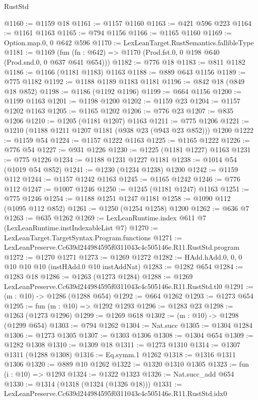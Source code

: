 \begin{lexlean}{RustStd}
\begin{coremodule}
@1160 := @1159 @18
@1161 := @1157 @1160
@1163 := @421 @596 @223
@1164 := @1161 @1163
@1165 := @794 @1156
@1166 := @1165 @1160
@1169 := Option.map.{0, 0} @642 @596
@1170 := LexLeanTarget.RustSemantics.fallibleType
@1181 := @1169
    (fun (fn : @642) => @1170 (Prod.fst.{0, 0} @198 @640 (Prod.snd.{0, 0} @637 @641 @654)))
@1182 := @776 @18
@1183 := @811 @1182
@1186 := @1166 (@1181 @1183) @1163
@1188 := @889 @643 @1156
@1189 := @775 @1182
@1192 := @1188 @1189 @1183 @1181
@1196 := @842 @18 (@849 @18 @852)
@1198 := @1186 (@1192 @1196)
@1199 := @664 @1156
@1200 := @1199 @1163
@1201 := @1198 @1200
@1202 := @1159 @23
@1204 := @1157 @1202 @1163
@1205 := @1165 @1202
@1206 := @776 @23
@1207 := @835 @1206
@1210 := @1205 (@1181 @1207) @1163
@1211 := @775 @1206
@1221 := @1210 (@1188 @1211 @1207 @1181 (@938 @23 (@943 @23 @852))) @1200
@1222 := @1159 @54
@1224 := @1157 @1222 @1163
@1225 := @1165 @1222
@1226 := @776 @54
@1227 := @931 @1226
@1230 := @1225 (@1181 @1227) @1163
@1231 := @775 @1226
@1234 := @1188 @1231 @1227 @1181
@1238 := @1014 @54 (@1019 @54 @852)
@1241 := @1230 (@1234 @1238) @1200
@1242 := @1159 @112
@1244 := @1157 @1242 @1163
@1245 := @1165 @1242
@1246 := @776 @112
@1247 := @1007 @1246
@1250 := @1245 (@1181 @1247) @1163
@1251 := @775 @1246
@1254 := @1188 @1251 @1247 @1181
@1258 := @1090 @112 (@1095 @112 @852)
@1261 := @1250 (@1254 @1258) @1200
@1262 := @636 @7
@1263 := @635 @1262
@1269 := LexLeanRuntime.index @611 @7 (LexLeanRuntime.instIndexableList @7)
@1270 := LexLeanTarget.TargetSyntax.Program.functions
@1271 := LexLeanPreserve.Cc639d244984595f0311043c4c505146e.R11.RustStd.program
@1272 := @1270 @1271
@1273 := @1269 @1272
@1282 := HAdd.hAdd.{0, 0, 0} @10 @10 @10 (instHAdd.{0} @10 instAddNat)
@1283 := @1282 @654
@1284 := @1283 @18
@1286 := @1263 (@1273 @1284)
@1288 := @1269 LexLeanPreserve.Cc639d244984595f0311043c4c505146e.R11.RustStd.tl0
@1291 := (m : @10) -> @1286 (@1288 @654)
@1292 := @664 @1262
@1293 := @1273 @654
@1295 := fun (m : @10) => @1292 @1293
@1296 := @1283 @23
@1298 := @1263 (@1273 @1296)
@1299 := @1269 @618
@1302 := (m : @10) -> @1298 (@1299 @654)
@1303 := @794 @1262
@1304 := Nat.succ
@1305 := @1304 @1284
@1306 := @1273 @1305
@1307 := @1303 @1306
@1308 := @1304 @654
@1309 := @1282 @1308
@1310 := @1309 @18
@1311 := @1273 @1310
@1314 := @1307 @1311 (@1288 @1308)
@1316 := Eq.symm.{1} @1262
@1318 := @1316 @1311 @1306
@1320 := @889 @10 @1262
@1322 := @1320 @1310 @1305
@1323 := fun (i : @10) => @1293
@1324 := @1322 @1323
@1326 := Nat.succ_add @654
@1330 := @1314 (@1318 (@1324 (@1326 @18)))
@1331 := LexLeanPreserve.Cc639d244984595f0311043c4c505146e.R11.RustStd.idx0

\end{coremodule}
\end{lexlean}

